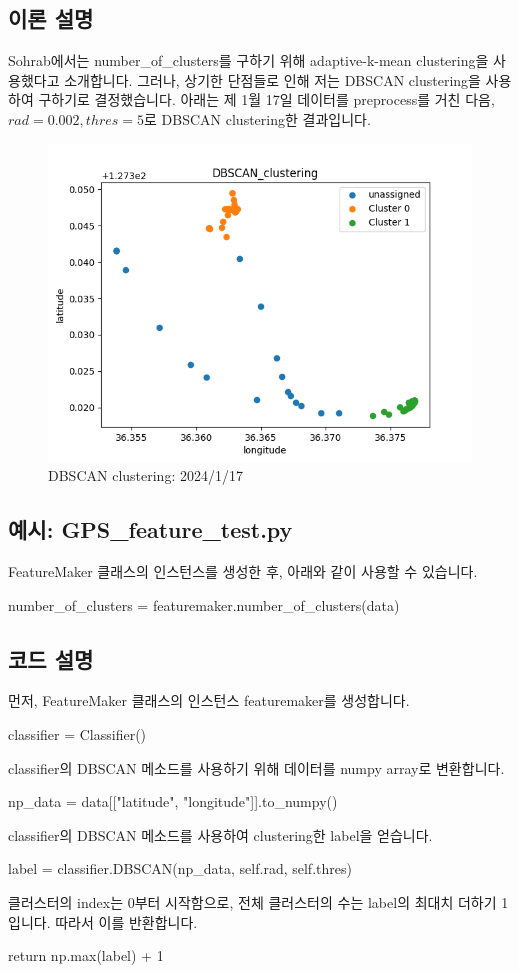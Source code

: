 \documentclass{oblivoir}
\begin{document}
  \subsection{이론 설명}
  Sohrab\cite{Sohrab}에서는 number\_of\_clusters를 구하기 위해 adaptive-k-mean clustering을 사용했다고 소개합니다.
  그러나, 상기한 단점들로 인해 저는 DBSCAN clustering을 사용하여 구하기로 결정했습니다.
  아래는 제 1월 17일 데이터를 preprocess를 거친 다음, $rad=0.002,thres=5$로 DBSCAN clustering한 결과입니다.
  \begin{figure}[H]
    \centering
    \caption{ DBSCAN clustering: 2024/1/17}
    \includegraphics[width=.5\textwidth]{GPS_feature_4.png}
  \end{figure}

  \subsection{예시: GPS\_feature\_test.py}
  FeatureMaker 클래스의 인스턴스를 생성한 후, 아래와 같이 사용할 수 있습니다.
  \begin{python}[label={GPS_feature_12}]
    number_of_clusters = featuremaker.number_of_clusters(data)
  \end{python}

  \subsection{코드 설명}
  먼저, FeatureMaker 클래스의 인스턴스 featuremaker를 생성합니다.
  \begin{python}[label={GPS_feature_13}]
    classifier = Classifier()
  \end{python}
  classifier의 DBSCAN 메소드를 사용하기 위해 데이터를 numpy array로 변환합니다.
  \begin{python}[label={GPS_feature_14}]
    np_data = data[["latitude", "longitude"]].to_numpy()
  \end{python}
  classifier의 DBSCAN 메소드를 사용하여 clustering한 label을 얻습니다.
  \begin{python}[label={GPS_feature_15}]
    label = classifier.DBSCAN(np_data, self.rad, self.thres)
  \end{python}  
  클러스터의 index는 0부터 시작함으로, 전체 클러스터의 수는 label의 최대치 더하기 1입니다.
  따라서 이를 반환합니다.
  \begin{python}[label={GPS_feature_16}]
    return np.max(label) + 1
  \end{python}
\end{document}
